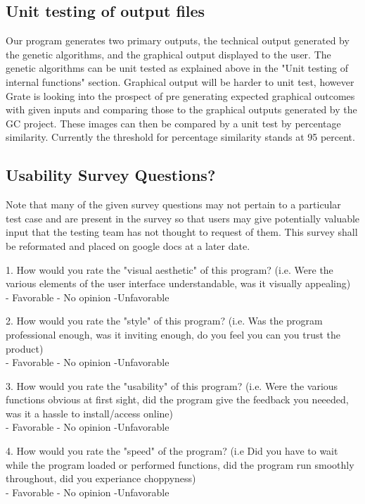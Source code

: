 \documentclass[12pt, titlepage]{article}
\begin{document}
\subsection{Unit testing of output files}		

Our program generates two primary outputs, the technical output generated by the genetic algorithms, and the graphical output displayed to the user. The genetic algorithms can be unit tested as explained above in the "Unit testing of internal functions" section. Graphical output will be harder to unit test, however Grate is looking into the prospect of pre generating expected graphical outcomes with given inputs and comparing those to the graphical outputs generated by the GC project. These images can then be compared by a unit test by percentage similarity. Currently the threshold for percentage similarity stands at 95 percent.





\newpage

\subsection{Usability Survey Questions?}

Note that many of the given survey questions may not pertain to a particular test case and are present in the survey so that users may give potentially valuable input that the testing team has not thought to request of them. This survey shall be reformated and placed on google docs at a later date.

1. How would you rate the "visual aesthetic" of this program? (i.e. Were the various elements of the user interface understandable, was it visually appealing)\\
- Favorable
- No opinion
-Unfavorable

2. How would you rate the "style" of this program? (i.e. Was the program professional enough, was it inviting enough,  do you feel you can you trust the product)\\
- Favorable
- No opinion
-Unfavorable

3. How would you rate the "usability" of this program? (i.e. Were the various functions obvious at first sight, did the program give the feedback you neeeded, was it a hassle to install/access online)\\
- Favorable
- No opinion
-Unfavorable

4. How would you rate the "speed" of the program? (i.e Did you have to wait while the program loaded or performed functions, did the program run smoothly throughout, did you experiance choppyness)\\
- Favorable
- No opinion
-Unfavorable
\end{document}
